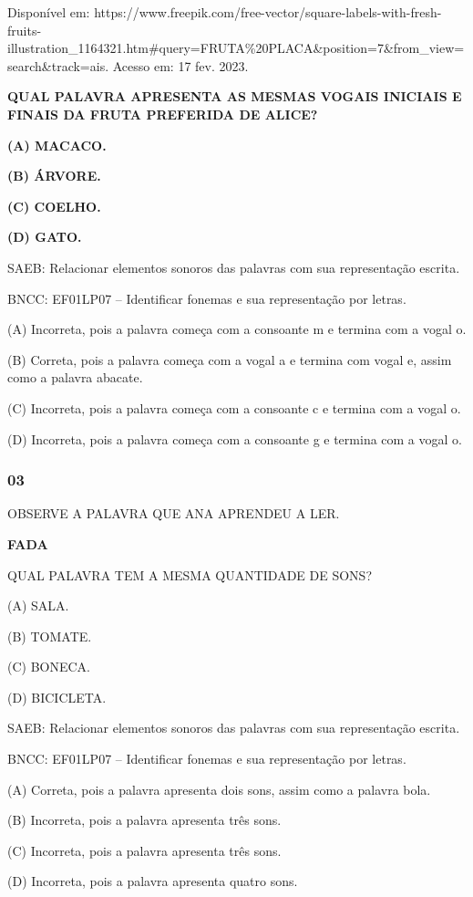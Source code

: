 Disponível
em: https://www.freepik.com/free-vector/square-labels-with-fresh-fruits-illustration\_1164321.htm\#query=FRUTA\%20PLACA\&position=7\&from\_view=search\&track=ais. Acesso em: 17 fev. 2023.

\textbf{QUAL PALAVRA APRESENTA AS MESMAS VOGAIS INICIAIS E FINAIS DA FRUTA PREFERIDA DE ALICE?}

\textbf{(A) MACACO.}

\textbf{(B) ÁRVORE.}

\textbf{(C) COELHO.}

\textbf{(D) GATO.}

SAEB: Relacionar elementos sonoros das palavras com sua
representação escrita.

BNCC: EF01LP07 -- Identificar fonemas e sua representação por
letras.

(A) Incorreta, pois a palavra começa com a consoante m e termina com a
vogal o.

(B) Correta, pois a palavra começa com a vogal a e termina com vogal e, assim como a
palavra abacate.

(C) Incorreta, pois a palavra começa com a consoante c e termina com a
vogal o.

(D) Incorreta, pois a palavra começa com a consoante g e termina com a
vogal o.

\subsubsection{03}\label{section-43}

OBSERVE A PALAVRA QUE ANA APRENDEU A LER.

\textbf{FADA}

QUAL PALAVRA TEM A MESMA QUANTIDADE DE SONS?

(A) SALA.

(B) TOMATE.

(C) BONECA.

(D) BICICLETA.

SAEB: Relacionar elementos sonoros das palavras com sua
representação escrita.

BNCC: EF01LP07 -- Identificar fonemas e sua representação por
letras.

(A) Correta, pois a palavra apresenta dois sons, assim como
a palavra bola.

(B) Incorreta, pois a palavra apresenta três sons.

(C) Incorreta, pois a palavra apresenta três sons.

(D) Incorreta, pois a palavra apresenta quatro sons.

